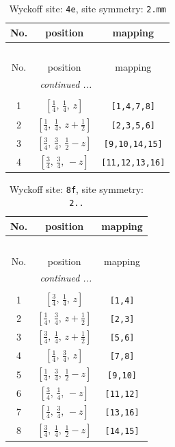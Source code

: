 \documentclass[fleqn,8pt]{jsarticle}
\begin{document}
\renewcommand{\arraystretch}{1.2}
\begin{longtable}{ccc}
\caption{Wyckoff site: {\tt 4e}, site symmetry: {\tt 2.mm}}
 \\
 \hline \hline
No. & position & mapping \\ \hline \endfirsthead

\multicolumn{2}{l}{\tablename\ \thetable{}} \\
 \hline \hline
No. & position & mapping \\ \hline \endhead

 \hline \hline
\multicolumn{2}{r}{\footnotesize\it continued ...} \\ \endfoot

 \hline \hline
\multicolumn{2}{r}{} \\ \endlastfoot

1 & $\left[ \frac{1}{4},\, \frac{1}{4},\, z \right]$ & {\tt [1,4,7,8]} \\ \hline
2 & $\left[ \frac{1}{4},\, \frac{1}{4},\, z + \frac{1}{2} \right]$ & {\tt [2,3,5,6]} \\ \hline
3 & $\left[ \frac{3}{4},\, \frac{3}{4},\, \frac{1}{2} - z \right]$ & {\tt [9,10,14,15]} \\ \hline
4 & $\left[ \frac{3}{4},\, \frac{3}{4},\, - z \right]$ & {\tt [11,12,13,16]} \\
\end{longtable}
\renewcommand{\arraystretch}{1.2}
\begin{longtable}{ccc}
\caption{Wyckoff site: {\tt 8f}, site symmetry: {\tt 2..}}
 \\
 \hline \hline
No. & position & mapping \\ \hline \endfirsthead

\multicolumn{2}{l}{\tablename\ \thetable{}} \\
 \hline \hline
No. & position & mapping \\ \hline \endhead

 \hline \hline
\multicolumn{2}{r}{\footnotesize\it continued ...} \\ \endfoot

 \hline \hline
\multicolumn{2}{r}{} \\ \endlastfoot

1 & $\left[ \frac{3}{4},\, \frac{1}{4},\, z \right]$ & {\tt [1,4]} \\ \hline
2 & $\left[ \frac{1}{4},\, \frac{3}{4},\, z + \frac{1}{2} \right]$ & {\tt [2,3]} \\ \hline
3 & $\left[ \frac{3}{4},\, \frac{1}{4},\, z + \frac{1}{2} \right]$ & {\tt [5,6]} \\ \hline
4 & $\left[ \frac{1}{4},\, \frac{3}{4},\, z \right]$ & {\tt [7,8]} \\ \hline
5 & $\left[ \frac{1}{4},\, \frac{3}{4},\, \frac{1}{2} - z \right]$ & {\tt [9,10]} \\ \hline
6 & $\left[ \frac{3}{4},\, \frac{1}{4},\, - z \right]$ & {\tt [11,12]} \\ \hline
7 & $\left[ \frac{1}{4},\, \frac{3}{4},\, - z \right]$ & {\tt [13,16]} \\ \hline
8 & $\left[ \frac{3}{4},\, \frac{1}{4},\, \frac{1}{2} - z \right]$ & {\tt [14,15]} \\
\end{longtable}
\end{document}

